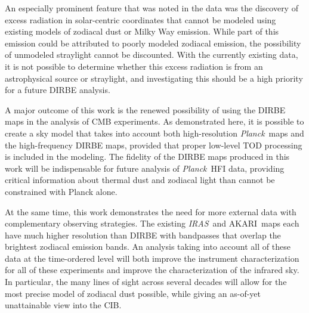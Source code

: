 \documentclass{aa}
\def\Planck{\textit{Planck}}
\def\AKARI{\textrm{{AKARI}}}
\def\IRAS{\textit{{IRAS}}}
\begin{document}
An especially prominent feature that was noted in the data was the discovery of excess radiation in solar-centric coordinates that cannot be modeled using existing models of zodiacal dust or Milky Way emission. While part of this emission could be attributed to poorly modeled zodiacal emission, the possibility of unmodeled straylight cannot be discounted. With the currently existing data, it is not possible to determine whether this excess radiation is from an astrophysical source or straylight, and investigating this should be a high priority for a future DIRBE analysis.

A major outcome of this work is the renewed possibility of using the DIRBE maps in the analysis of CMB experiments. As demonstrated here, it is possible to create a sky model that takes into account both high-resolution \Planck\ maps and the high-frequency DIRBE maps, provided that proper low-level TOD processing is included in the modeling. The fidelity of the DIRBE maps produced in this work will be indispensable for future analysis of \Planck\ HFI data, providing critical information about thermal dust and zodiacal light than cannot be constrained with Planck alone.

At the same time, this work demonstrates the need for more external data with complementary observing strategies. The existing \IRAS\ and \AKARI\ maps each have much higher resolution than DIRBE with bandpasses that overlap the brightest zodiacal emission bands. An analysis taking into account all of these data at the time-ordered level will both improve the instrument characterization for all of these experiments and improve the characterization of the infrared sky. In particular, the many lines of sight across several decades will allow for the most precise model of zodiacal dust possible, while giving an as-of-yet unattainable view into the CIB.
\end{document}

